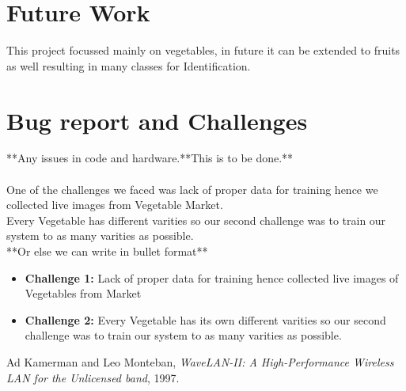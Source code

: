 \documentclass[a4paper,12pt,oneside]{book}
\begin{document}
 

\section{Future Work}
This project focussed mainly on vegetables, in future it can be extended to fruits as well resulting in many classes for Identification.
\newpage
\section{Bug report and Challenges}
**Any issues in code and hardware.**This is to be done.**\\\\
One of the challenges we faced was lack of proper data for training hence we collected live images from Vegetable Market.\\
Every Vegetable has different varities so our second challenge was to train our system to as many varities as possible.\\

**Or else we can write in bullet format**
\begin{itemize}
	\item \textbf{Challenge 1: }Lack of proper data for training hence collected live images of Vegetables from Market
	\item \textbf{Challenge 2: }Every Vegetable has its own different varities so our second challenge was to train our system to as many varities as possible.
\end{itemize}

\begin{thebibliography}{li}
Ad Kamerman and Leo Monteban,
{\em WaveLAN-II: A High-Performance Wireless LAN for the Unlicensed band},
1997.

\end{thebibliography}
\end{document}

